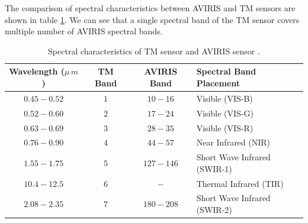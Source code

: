 The comparison of spectral characteristics between AVIRIS and TM sensors are
shown in table \ref{table:spectral_characteristics_AVIRIS_TM}.
We can see that a single spectral band of the TM sensor covers multiple
number of AVIRIS spectral bands.
\begin{table}[t]
    \centering
    \begin{tabular}{|c|c|c|l|}
        \hline
        Wavelength ($\mu\,m$) & TM Band & AVIRIS Band & Spectral Band Placement      \\ \hline
        $0.45 - 0.52$         & $1$     & $10 - 16$   & Visible (VIS-B)              \\
        $0.52 - 0.60$         & $2$     & $17 - 24$   & Visible (VIS-G)              \\
        $0.63 - 0.69$         & $3$     & $28 - 35$   & Visible (VIS-R)              \\
        $0.76 - 0.90$         & $4$     & $44 - 57$   & Near Infrared (NIR)          \\
        $1.55 - 1.75$         & $5$     & $127 - 146$ & Short Wave Infrared (SWIR-1) \\
        $10.4 - 12.5$         & $6$     & $-$         & Thermal Infrared (TIR)       \\
        $2.08 - 2.35$         & $7$     & $180 - 208$ & Short Wave Infrared (SWIR-2) \\ \hline
    \end{tabular}
    \caption{Spectral characteristics of TM sensor and AVIRIS sensor
             \cite{AVIRIS,
                   LANDSAT_USING,
                   LANDSAT_HANDBOOK,
                   MILITARY_UTILITY,
                   SPECTRAL_RESPONSE_OF_LANDSAT8}.}
    \label{table:spectral_characteristics_AVIRIS_TM}
\end{table}

